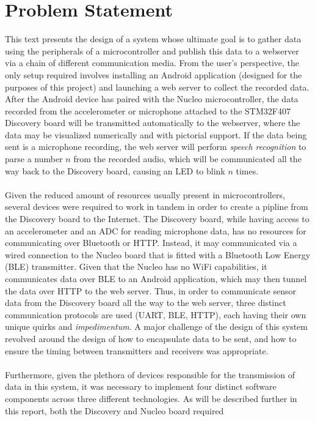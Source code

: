 \section{Problem Statement}
This text presents the design of a system whose ultimate goal is to gather data using the
peripherals of a microcontroller and publish this data to a webserver via a chain of different
communication media. From the user's perspective, the only setup required involves installing an
Android application (designed for the purposes of this project) and launching a web server to
collect the recorded data. After the Android device has paired with the Nucleo microcontroller, the
data recorded from the accelerometer or microphone attached to the STM32F407 Discovery board will be
transmitted automatically to the webserver, where the data may be visualized numerically and with
pictorial support. If the data being sent is a microphone recording, the web server will perform
\textit{speech recognition} to parse a number $n$ from the recorded audio, which will be communicated
all the way back to the Discovery board, causing an LED to blink $n$ times.\\\\
Given the reduced amount of resources usually present in microcontrollers, several devices were
required to work in tandem in order to create a pipline from the Discovery board to the Internet.
The Discovery board, while having access to an accelerometer and an ADC for reading microphone data,
has no resources for communicating over Bluetooth or HTTP. Instead, it may communicated via a wired
connection to the Nucleo board that is fitted with a Bluetooth Low Energy (BLE) transmitter. Given
that the Nucleo has no WiFi capabilities, it communicates data over BLE to an Android application,
which may then tunnel the data over HTTP to the web server.
Thus, in order to communicate sensor data from the Discovery board all the way to the web server, three
distinct communication protocols are used (UART, BLE, HTTP), each having their own unique quirks and
\textit{impedimentum}. A major challenge of the design of this system revolved around the design of
how to encapsulate data to be sent, and how to ensure the timing between transmitters and receivers
was appropriate.\\\\
Furthermore, given the plethora of devices responsible for the transmission of data in this system,
it was necessary to implement four distinct software components across three different technologies.
As will be described further in this report, both the Discovery and Nucleo board required
